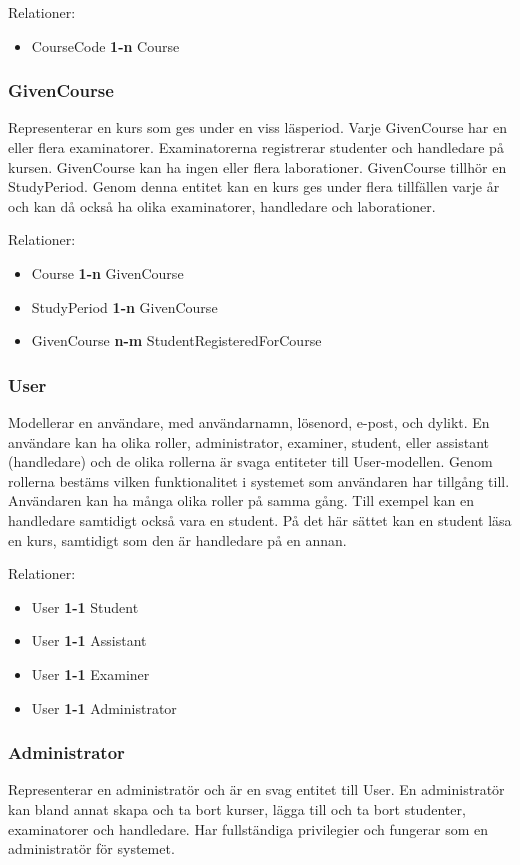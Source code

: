 Relationer:
\begin{itemize}
  \item CourseCode {\bf 1-n} Course
\end{itemize}


\subsubsection{GivenCourse}
Representerar en kurs som ges under en viss läsperiod. Varje GivenCourse har en eller flera examinatorer. Examinatorerna registrerar studenter och handledare på kursen. GivenCourse kan ha ingen eller flera laborationer. GivenCourse tillhör en StudyPeriod. Genom denna entitet kan en kurs ges under flera tillfällen varje år och kan då också ha olika examinatorer, handledare och laborationer.

Relationer:
\begin{itemize}
  \item Course {\bf 1-n} GivenCourse
  \item StudyPeriod {\bf 1-n} GivenCourse
  \item GivenCourse {\bf n-m} StudentRegisteredForCourse 
\end{itemize}


\subsubsection{User}
Modellerar en användare, med användarnamn, lösenord, e-post, och dylikt. En användare kan ha olika roller, administrator, examiner, student, eller assistant (handledare) och de olika rollerna är svaga entiteter till User-modellen. Genom rollerna bestäms vilken funktionalitet i systemet som användaren har tillgång till. Användaren kan ha många olika roller på samma gång. Till exempel kan en handledare samtidigt också vara en student. På det här sättet kan en student läsa en kurs, samtidigt som den är handledare på en annan. 

Relationer:
\begin{itemize}
  \item User {\bf 1-1} Student
  \item User {\bf 1-1} Assistant
  \item User {\bf 1-1} Examiner
  \item User {\bf 1-1} Administrator
\end{itemize}


\subsubsection{Administrator}
Representerar en administratör och är en svag entitet till User. En administratör kan bland annat skapa och ta bort kurser, lägga till och ta bort studenter, examinatorer och handledare. Har fullständiga privilegier och fungerar som en administratör för systemet.

